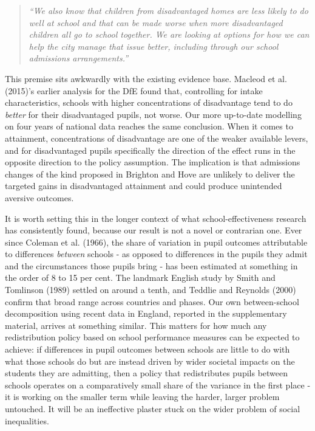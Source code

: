 \documentclass[
  12pt,
  titlepage]{article}
\begin{document}
\begin{quote}
\emph{``We also know that children from disadvantaged homes are less
likely to do well at school and that can be made worse when more
disadvantaged children all go to school together. We are looking at
options for how we can help the city manage that issue better, including
through our school admissions arrangements.''}
\end{quote}

This premise sits awkwardly with the existing evidence base. Macleod et
al. (2015)'s earlier analysis for the DfE found that, controlling for
intake characteristics, schools with higher concentrations of
disadvantage tend to do \emph{better} for their disadvantaged pupils,
not worse. Our more up-to-date modelling on four years of national data
reaches the same conclusion. When it comes to attainment, concentrations
of disadvantage are one of the weaker available levers, and for
disadvantaged pupils specifically the direction of the effect runs in
the opposite direction to the policy assumption. The implication is that
admissions changes of the kind proposed in Brighton and Hove are
unlikely to deliver the targeted gains in disadvantaged attainment and
could produce unintended aversive outcomes.

It is worth setting this in the longer context of what
school-effectiveness research has consistently found, because our result
is not a novel or contrarian one. Ever since Coleman et al. (1966), the
share of variation in pupil outcomes attributable to differences
\emph{between} schools - as opposed to differences in the pupils they
admit and the circumstances those pupils bring - has been estimated at
something in the order of 8 to 15 per cent. The landmark English study
by Smith and Tomlinson (1989) settled on around a tenth, and Teddlie and
Reynolds (2000) confirm that broad range across countries and phases.
Our own between-school decomposition using recent data in England,
reported in the supplementary material, arrives at something similar.
This matters for how much any redistribution policy based on school
performance measures can be expected to achieve: if differences in pupil
outcomes between schools are little to do with what those schools do but
are instead driven by wider societal impacts on the students they are
admitting, then a policy that redistributes pupils between schools
operates on a comparatively small share of the variance in the first
place - it is working on the smaller term while leaving the harder,
larger problem untouched. It will be an ineffective plaster stuck on the
wider problem of social inequalities.
\end{document}
